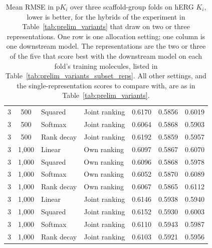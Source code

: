 \begin{table}[htbp]
\begin{tabular}{@{}ccllccc@{}}
3 & 500 & Squared & Joint ranking & 0.6170 & 0.5856 & 0.6019 \\
3 & 500 & Softmax & Joint ranking & 0.6064 & 0.5868 & 0.5903 \\
3 & 500 & Rank decay & Joint ranking & 0.6192 & 0.5859 & 0.5957 \\
3 & 1,000 & Linear & Own ranking & 0.6097 & 0.5867 & 0.6070 \\
3 & 1,000 & Squared & Own ranking & 0.6096 & 0.5868 & 0.5978 \\
3 & 1,000 & Softmax & Own ranking & 0.6052 & 0.5870 & 0.6089 \\
3 & 1,000 & Rank decay & Own ranking & 0.6067 & 0.5865 & 0.6112 \\
3 & 1,000 & Linear & Joint ranking & 0.6146 & 0.5938 & 0.5940 \\
3 & 1,000 & Squared & Joint ranking & 0.6152 & 0.5930 & 0.6003 \\
3 & 1,000 & Softmax & Joint ranking & 0.6110 & 0.5943 & 0.5987 \\
3 & 1,000 & Rank decay & Joint ranking & 0.6103 & 0.5921 & 0.5956 \\
\bottomrule
\end{tabular}
\caption[Allocation settings over two or three representations on hERG $K_i$.]{Mean RMSE in p$K_i$ over three scaffold-group folds on hERG $K_i$, lower is better, for the hybrids of the experiment in Table~\ref{tab:prelim_variants} that draw on two or three representations. One row is one allocation setting; one column is one downstream model. The representations are the two or three of the five that score best with the downstream model on each fold's training molecules, listed in Table~\ref{tab:prelim_variants_subset_reps}. All other settings, and the single-representation scores to compare with, are as in Table~\ref{tab:prelim_variants}.}
\label{tab:prelim_variants_subsets}
\end{table}

